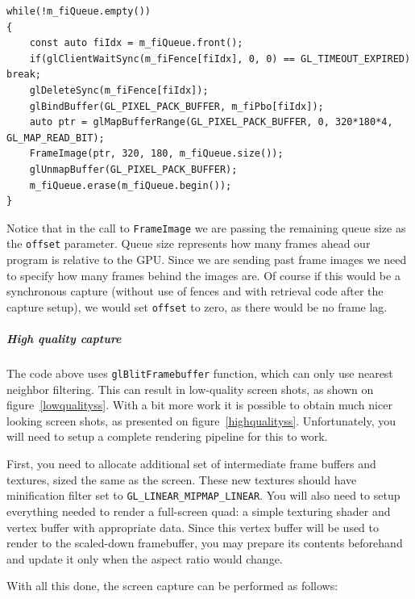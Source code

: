 \documentclass[hidelinks,titlepage,a4paper]{article}
\begin{document}
\begin{lstlisting}
while(!m_fiQueue.empty())
{
    const auto fiIdx = m_fiQueue.front();
    if(glClientWaitSync(m_fiFence[fiIdx], 0, 0) == GL_TIMEOUT_EXPIRED) break;
    glDeleteSync(m_fiFence[fiIdx]);
    glBindBuffer(GL_PIXEL_PACK_BUFFER, m_fiPbo[fiIdx]);
    auto ptr = glMapBufferRange(GL_PIXEL_PACK_BUFFER, 0, 320*180*4, GL_MAP_READ_BIT);
    FrameImage(ptr, 320, 180, m_fiQueue.size());
    glUnmapBuffer(GL_PIXEL_PACK_BUFFER);
    m_fiQueue.erase(m_fiQueue.begin());
}
\end{lstlisting}

Notice that in the call to \texttt{FrameImage} we are passing the remaining queue size as the \texttt{offset} parameter. Queue size represents how many frames ahead our program is relative to the GPU. Since we are sending past frame images we need to specify how many frames behind the images are. Of course if this would be a synchronous capture (without use of fences and with retrieval code after the capture setup), we would set \texttt{offset} to zero, as there would be no frame lag.

\subparagraph{High quality capture}

The code above uses \texttt{glBlitFramebuffer} function, which can only use nearest neighbor filtering. This can result in low-quality screen shots, as shown on figure~\ref{lowqualityss}. With a bit more work it is possible to obtain much nicer looking screen shots, as presented on figure~\ref{highqualityss}. Unfortunately, you will need to setup a complete rendering pipeline for this to work.

First, you need to allocate additional set of intermediate frame buffers and textures, sized the same as the screen. These new textures should have minification filter set to \texttt{GL\_LINEAR\_MIPMAP\_LINEAR}. You will also need to setup everything needed to render a full-screen quad: a simple texturing shader and vertex buffer with appropriate data. Since this vertex buffer will be used to render to the scaled-down framebuffer, you may prepare its contents beforehand and update it only when the aspect ratio would change.

With all this done, the screen capture can be performed as follows:
\end{document}
